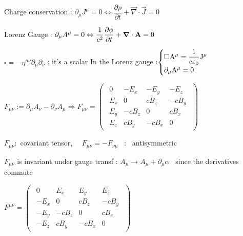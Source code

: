 \begin{squishlist}
\item Charge conservation : $\partial_{\mu}J^{\mu} = 0 \Leftrightarrow \dfrac{\partial \rho}{\partial t} + \vec{\nabla} \cdot \vec{J} = 0 $

\item Lorenz Gauge : $\partial_{\mu} A^{\mu} = 0 \Leftrightarrow \dfrac{1}{c^2} \dfrac{\partial \phi}{\partial t} + \vec{\nabla} \cdot \vec{\rm{A}} = 0$

\item $\square = -\eta^{\mu\nu} \partial_{\mu}\partial_{\nu}$ : it's a scalar 
%
\squishsep In the Lorenz gauge :$\begin{cases}
\square \rm{A}^{\mu} = \dfrac{1}{c \varepsilon_0 }  J^{\mu}  \\
\partial_{\mu} \rm{A}^{\mu} = 0
\end{cases}$



\item $F_{\mu\nu}:=\partial_\mu A_\nu-\partial_\nu A_\mu \Rightarrow F_{\mu\nu}=\begin{pmatrix}
\begin{array}{cccc}
0 & -E_x & -E_y & -E_z \\ 
E_x & 0 & c B_z & -c B_y \\ 
E_y&-cB_z  & 0 & c B_x \\ 
E_z&  cB_y& -cB_x & 0
\end{array} 
\end{pmatrix}$

\item $F_{\mu\nu} : $ covariant tensor, $\quad F_{\mu\nu} = - F_{\nu\mu}$ \, : \, antisymmetric

\item $F_{\mu\nu}$ is invariant under gauge transf : $A_{\mu} \rightarrow A_{\mu} + \partial_{\mu}\alpha $ \, since the derivatives commute

\item $F^{\mu\nu}=\begin{pmatrix}
\begin{array}{cccc}
0 & E_x & E_y & E_z \\ 
-E_x & 0 & c B_z & -c B_y \\ 
-E_y & -cB_z  & 0 & c B_x \\ 
-E_z &  cB_y& -cB_x & 0
\end{array} 
\end{pmatrix}$


\end{squishlist}
